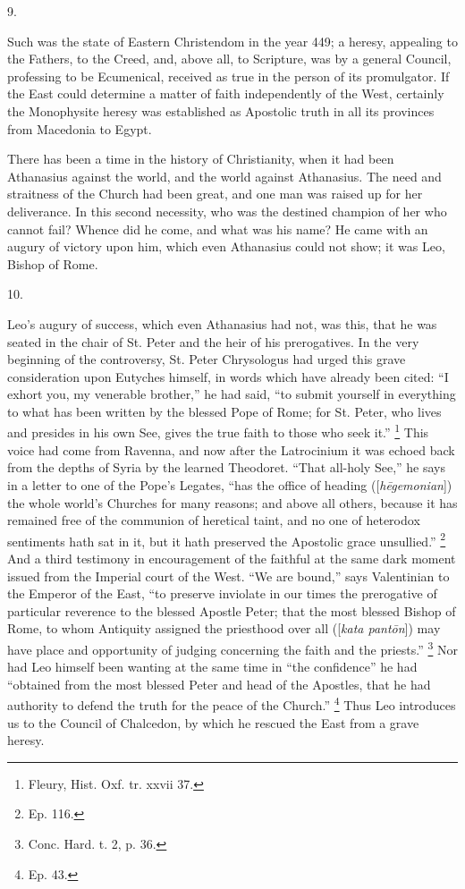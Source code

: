 9.

Such was the state of Eastern Christendom in the year 449; a
heresy, appealing to the Fathers, to the Creed, and, above all, to
Scripture, was by a general Council, professing to be Ecumenical,
received as true in the person of its promulgator. If the East could
determine a matter of faith independently of the West, certainly the
Monophysite heresy was established as Apostolic truth in all its
provinces from Macedonia to Egypt.

There has been a time in the history of Christianity, when it had
been Athanasius against the world, and the world against Athanasius.
The need and straitness of the Church had been great, and one man was
raised up for her deliverance. In this second necessity, who was the
destined champion of her who cannot fail? Whence did he come, and what
was his name? He came with an augury of victory upon him, which even
Athanasius could not show; it was Leo, Bishop of Rome.

10.

Leo's augury of success, which even Athanasius had not, was this,
that he was seated in the chair of St. Peter and the heir of his
prerogatives. In the very beginning of the controversy, St. Peter
Chrysologus had urged this grave consideration upon Eutyches himself,
in words which have already been cited: ``I exhort you, my
venerable brother,'' he had said, ``to submit yourself in
everything to what has been written by the blessed Pope of Rome; for
St. Peter, who lives and presides in his own See, gives the true faith
to those who seek it.'' \footnote{Fleury, Hist. Oxf. tr. xxvii 37.}
This voice had come from Ravenna, and now after the Latrocinium it was
echoed back from the depths of Syria by the learned Theodoret.
``That all-holy See,'' he says in a letter to one of the
Pope's Legates, ``has the office of heading ([\emph{h\={e}gemonian}])
the whole world's Churches for many reasons; and above all others,
because it has remained free of the communion of heretical taint, and
no one of heterodox sentiments hath sat in it, but it hath preserved
the Apostolic grace unsullied.'' \footnote{Ep. 116.} And a third testimony in encouragement of the faithful at the
same dark moment issued from the Imperial court of the West. ``We
are bound,'' says Valentinian to the Emperor of the East, ``to
preserve inviolate in our times the prerogative of particular
reverence to the blessed Apostle Peter; that the most blessed Bishop
of Rome, to whom Antiquity assigned the priesthood over all ([\emph{kata
pant\={o}n}]) may have place and
opportunity of judging concerning the faith and the priests.'' \footnote{Conc. Hard. t. 2, p. 36.} Nor had Leo himself been wanting at the same time in
``the confidence'' he had ``obtained from the most blessed
Peter and head of the Apostles, that he had authority to defend the
truth for the peace of the Church.'' \footnote{Ep. 43.} Thus Leo introduces us to the Council of Chalcedon, by which
he rescued the East from a grave heresy.

